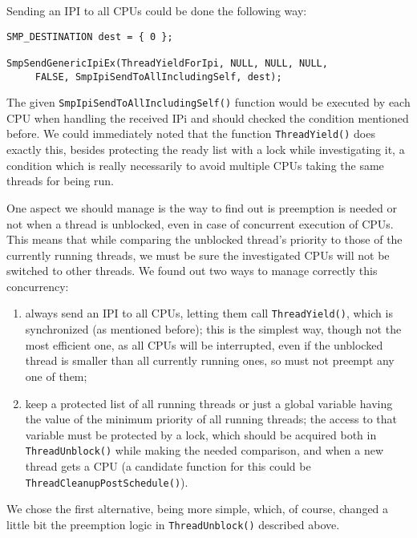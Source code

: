 Sending an IPI to all CPUs could be done the following way:
\begin{lstlisting}
SMP_DESTINATION dest = { 0 };

SmpSendGenericIpiEx(ThreadYieldForIpi, NULL, NULL, NULL, 
     FALSE, SmpIpiSendToAllIncludingSelf, dest);    
\end{lstlisting}

The given \lstinline|SmpIpiSendToAllIncludingSelf()| function would be executed by each CPU when handling the received IPi and should checked the condition mentioned before. We could immediately noted that the function \lstinline|ThreadYield()| does exactly this, besides protecting the ready list with a lock while investigating it, a condition which is really necessarily to avoid multiple CPUs taking the same threads for being run. 

One aspect we should manage is the way to find out is preemption is needed or not when a thread is unblocked, even in case of concurrent execution of CPUs. This means that while comparing the unblocked thread's priority to those of the currently running threads, we must be sure the investigated CPUs will not be switched to other threads. We found out two ways to manage correctly this concurrency:
\begin{enumerate}
    \item always send an IPI to all CPUs, letting them call \lstinline|ThreadYield()|, which is synchronized (as mentioned before); this is the simplest way, though not the most efficient one, as all CPUs will be interrupted, even if the unblocked thread is smaller than all currently running ones, so must not preempt any one of them;
    
    \item keep a protected list of all running threads or just a global variable having the value of the minimum priority of all running threads; the access to that variable must be protected by a lock, which should be acquired both in \lstinline|ThreadUnblock()| while making the needed comparison, and when a new thread gets a CPU (a candidate function for this could be \lstinline|ThreadCleanupPostSchedule()|).
\end{enumerate}

We chose the first alternative, being more simple, which, of course, changed a little bit the preemption logic in \lstinline|ThreadUnblock()| described above.

